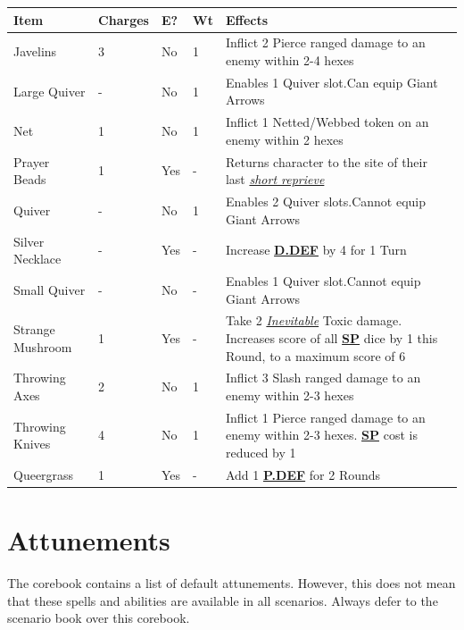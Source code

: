 \documentclass[12pt]{article}
\newcommand{\refto}[1]{\hyperlink{#1}{\textbf{#1}}}
\newcommand{\reftoit}[1]{\hyperlink{#1}{\emph{#1}}}
\begin{document}
\pagebreak

\begin{center}
\begin{tabularx}{\textwidth}{p{}p{}p{}p{}p{}}
\hline
\rowcolor{white} \textbf{Item} & \textbf{Charges} & \textbf{E?} & \textbf{Wt} & \textbf{Effects}\setcounter{rownum}{0}\\
\hline
Javelins & 3 & No & 1 & Inflict 2 Pierce ranged damage to an enemy within 2-4 hexes \\
Large Quiver & - & No & 1 & Enables 1 Quiver slot.\newline Can equip Giant Arrows \\
Net & 1 & No & 1 & Inflict 1 Netted/Webbed token on an enemy within 2 hexes \\
Prayer Beads & 1 & Yes & - & Returns character to the site of their last \reftoit{short reprieve} \\
Quiver & - & No & 1 & Enables 2 Quiver slots.\newline Cannot equip Giant Arrows \\
Silver Necklace & - & Yes & - & Increase \refto{D.DEF} by 4 for 1 Turn \\
Small Quiver & - & No & - & Enables 1 Quiver slot.\newline Cannot equip Giant Arrows \\
Strange Mushroom & 1 & Yes & - & Take 2 \reftoit{Inevitable} Toxic damage. Increases score of all \refto{SP} dice by 1 this Round, to a maximum score of 6\\
Throwing Axes & 2 & No & 1 & Inflict 3 Slash ranged damage to an enemy within 2-3 hexes \\
Throwing Knives & 4 & No & 1 & Inflict 1 Pierce ranged damage to an enemy within 2-3 hexes. \refto{SP} cost is reduced by 1 \\
Queergrass & 1 & Yes & - & Add 1 \refto{P.DEF} for 2 Rounds \\
\hline
\end{tabularx}
\end{center}

\pagebreak

\section{Attunements}
The corebook contains a list of default attunements. However, this does not mean that these spells and abilities are available in all scenarios. Always defer to the scenario book over this corebook.
\end{document}
